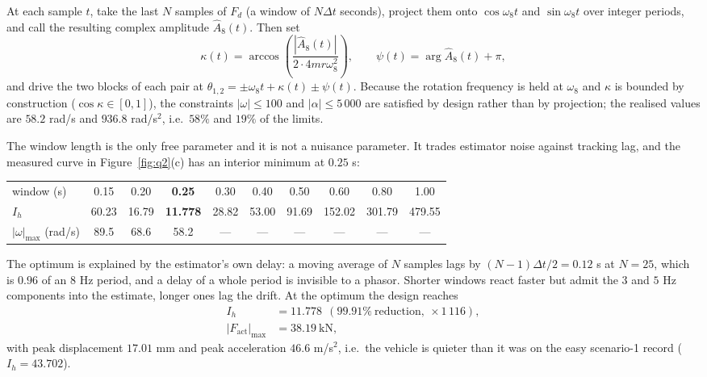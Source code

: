 \documentclass[12pt]{apmcmthesis}
\begin{document}
At each sample $t$, take the last $N$ samples of $F_d$ (a window of $N\Delta t$ seconds), project
them onto $\cos\omega_8 t$ and $\sin\omega_8 t$ over integer periods, and call the resulting
complex amplitude $\hat A_8(t)$. Then set
\begin{equation}
\kappa(t)=\arccos\!\left(\frac{|\hat A_8(t)|}{2\cdot 4mr\omega_8^2}\right),\qquad
\psi(t)=\arg\hat A_8(t)+\pi ,
\label{eq:track}
\end{equation}
and drive the two blocks of each pair at
$\theta_{1,2}=\pm\omega_8 t+\kappa(t)\pm\psi(t)$. Because the rotation frequency is held at
$\omega_8$ and $\kappa$ is bounded by construction ($\cos\kappa\in[0,1]$), the constraints
$|\omega|\le100$ and $|\alpha|\le5\,000$ are satisfied by design rather than by projection; the
realised values are $58.2$ rad/s and $936.8$ rad/s$^2$, i.e.\ $58\%$ and $19\%$ of the limits.

The window length is the only free parameter and it is not a nuisance parameter. It trades
estimator noise against tracking lag, and the measured curve in Figure~\ref{fig:q2}(c) has an
interior minimum at $0.25$ s:
\begin{center}\small\setlength{\tabcolsep}{4pt}
\begin{tabular}{@{}lccccccccc@{}}
\toprule
window (s) & 0.15 & 0.20 & \textbf{0.25} & 0.30 & 0.40 & 0.50 & 0.60 & 0.80 & 1.00 \\
$I_h$ & 60.23 & 16.79 & \textbf{11.778} & 28.82 & 53.00 & 91.69 & 152.02 & 301.79 & 479.55 \\
$|\omega|_{\max}$ (rad/s) & 89.5 & 68.6 & 58.2 & --- & --- & --- & --- & --- & --- \\
\bottomrule
\end{tabular}\end{center}
The optimum is explained by the estimator's own delay: a moving average of $N$ samples lags by
$(N-1)\Delta t/2=0.12$ s at $N=25$, which is $0.96$ of an $8$ Hz period, and a delay of a whole
period is invisible to a phasor. Shorter windows react faster but admit the $3$ and $5$ Hz
components into the estimate, longer ones lag the drift. At the optimum the design reaches
\begin{equation}
\begin{aligned}
I_h&=\mathbf{11.778}\ \ (99.91\%\ \text{reduction},\ \times1\,116),\\
|F_{\text{act}}|_{\max}&=38.19\ \text{kN},
\end{aligned}
\end{equation}
with peak displacement $17.01$ mm and peak acceleration $46.6$ m/s$^2$, i.e.\ the vehicle is
quieter than it was on the easy scenario-1 record ($I_h=43.702$).
\end{document}
